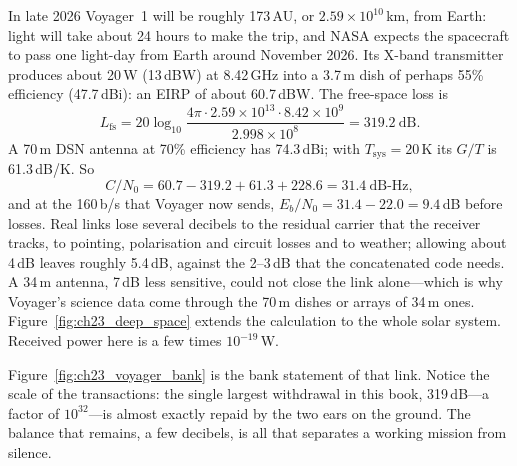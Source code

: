 \begin{worked}
In late 2026 Voyager~1 will be roughly 173\,AU, or $2.59\times10^{10}$\,km, from Earth: light will take
about 24 hours to make the trip, and NASA expects the spacecraft to pass one light-day from Earth
around November 2026. Its X-band transmitter produces about 20\,W (13\,dBW) at 8.42\,GHz into a
3.7\,m dish of perhaps 55\% efficiency (47.7\,dBi): an EIRP of about 60.7\,dBW. The free-space loss is
\[
L_{\text{fs}}=20\log_{10}\frac{4\pi\cdot2.59\times10^{13}\cdot8.42\times10^9}{2.998\times10^8}=319.2\ \text{dB}.
\]
A 70\,m DSN antenna at 70\% efficiency has 74.3\,dBi; with $T_{\text{sys}}=20$\,K its $G/T$ is
61.3\,dB/K. So
\[
C/N_0=60.7-319.2+61.3+228.6=31.4\ \text{dB-Hz},
\]
and at the 160\,b/s that Voyager now sends, $E_b/N_0=31.4-22.0=9.4$\,dB before losses. Real links
lose several decibels to the residual carrier that the receiver tracks, to pointing, polarisation
and circuit losses and to weather; allowing about 4\,dB leaves roughly 5.4\,dB, against the
2--3\,dB that the concatenated code needs. A 34\,m antenna, 7\,dB less sensitive, could not close
the link alone---which is why Voyager's science data come through the 70\,m dishes or arrays of
34\,m ones. Figure~\ref{fig:ch23_deep_space} extends the calculation to the whole solar system.
Received power here is a few times $10^{-19}$\,W.
\end{worked}


Figure~\ref{fig:ch23_voyager_bank} is the bank statement of that link. Notice the scale of the
transactions: the single largest withdrawal in this book, 319\,dB---a factor of $10^{32}$---is almost
exactly repaid by the two ears on the ground. The balance that remains, a few decibels, is all that
separates a working mission from silence.


